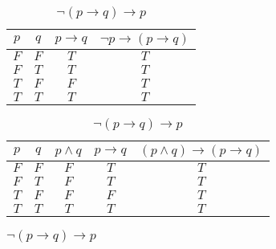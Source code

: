 \documentclass[10pt]{ctexart}
\begin{document}
\begin{table}[h]
\begin{subtable}[h]{2in}
                \setlength{\abovecaptionskip}{0pt}
                \setlength{\belowcaptionskip}{0pt}
                \centering
                \caption{$\neg p \rightarrow (p \rightarrow q)$}
                \begin{tabular}{|c|c|c|c|}
                    \hline
                    $p$ & $q$ & $p \rightarrow q$ & $\neg p \rightarrow (p \rightarrow q)$ \\
                    \hline
                    $F$ & $F$ & $T$ & $T$ \\ 
                    \hline
                    $F$ & $T$ & $T$ & $T$ \\ 
                    \hline
                    $T$ & $F$ & $F$ & $T$ \\ 
                    \hline
                    $T$ & $T$ & $T$ & $T$ \\ 
                    \hline
                \end{tabular}
            \end{subtable}            
            \begin{subtable}[h]{4in}
                \setlength{\abovecaptionskip}{0pt}
                \setlength{\belowcaptionskip}{0pt}
                \centering
                \caption{$(p \wedge q) \rightarrow (p \rightarrow q)$}
                \begin{tabular}{|c|c|c|c|c|}
                    \hline
                    $p$ & $q$ & $p \wedge q$ & $p \rightarrow q$ & $(p \wedge q) \rightarrow (p \rightarrow q)$ \\
                    \hline
                    $F$ & $F$ & $F$ & $T$ & $T$ \\ 
                    \hline
                    $F$ & $T$ & $F$ & $T$ & $T$ \\ 
                    \hline
                    $T$ & $F$ & $F$ & $F$ & $T$ \\ 
                    \hline
                    $T$ & $T$ & $T$ & $T$ & $T$ \\ 
                    \hline
                \end{tabular}
            \end{subtable}
            \begin{subtable}[h]{2in}
                \setlength{\abovecaptionskip}{0pt}
                \setlength{\belowcaptionskip}{0pt}
                \centering
                \caption{$\neg (p \rightarrow q) \rightarrow p$}
                \begin{tabular}{|c|c|c|c|}

\end{tabular}
\end{subtable}
\end{table}
\end{document}
